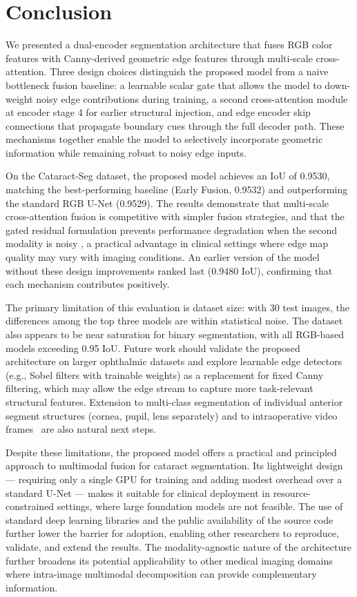 \section{Conclusion}

We presented a dual-encoder segmentation architecture that fuses RGB color features with Canny-derived geometric edge features through multi-scale cross-attention. Three design choices distinguish the proposed model from a naive bottleneck fusion baseline: a learnable scalar gate that allows the model to down-weight noisy edge contributions during training, a second cross-attention module at encoder stage 4 for earlier structural injection, and edge encoder skip connections that propagate boundary cues through the full decoder path. These mechanisms together enable the model to selectively incorporate geometric information while remaining robust to noisy edge inputs.

On the Cataract-Seg dataset, the proposed model achieves an IoU of 0.9530, matching the best-performing baseline (Early Fusion, 0.9532) and outperforming the standard RGB U-Net (0.9529). The results demonstrate that multi-scale cross-attention fusion is competitive with simpler fusion strategies, and that the gated residual formulation prevents performance degradation when the second modality is noisy ,  a practical advantage in clinical settings where edge map quality may vary with imaging conditions. An earlier version of the model without these design improvements ranked last (0.9480 IoU), confirming that each mechanism contributes positively.

The primary limitation of this evaluation is dataset size: with 30 test images, the differences among the top three models are within statistical noise. The dataset also appears to be near saturation for binary segmentation, with all RGB-based models exceeding 0.95 IoU. Future work should validate the proposed architecture on larger ophthalmic datasets and explore learnable edge detectors (e.g., Sobel filters with trainable weights) as a replacement for fixed Canny filtering, which may allow the edge stream to capture more task-relevant structural features. Extension to multi-class segmentation of individual anterior segment structures (cornea, pupil, lens separately) and to intraoperative video frames~\cite{grammatikopoulou2021cadis} are also natural next steps.

Despite these limitations, the proposed model offers a practical and principled approach to multimodal fusion for cataract segmentation. Its lightweight design --- requiring only a single GPU for training and adding modest overhead over a standard U-Net --- makes it suitable for clinical deployment in resource-constrained settings, where large foundation models are not feasible. The use of standard deep learning libraries and the public availability of the source code further lower the barrier for adoption, enabling other researchers to reproduce, validate, and extend the results. The modality-agnostic nature of the architecture further broadens its potential applicability to other medical imaging domains where intra-image multimodal decomposition can provide complementary information.

